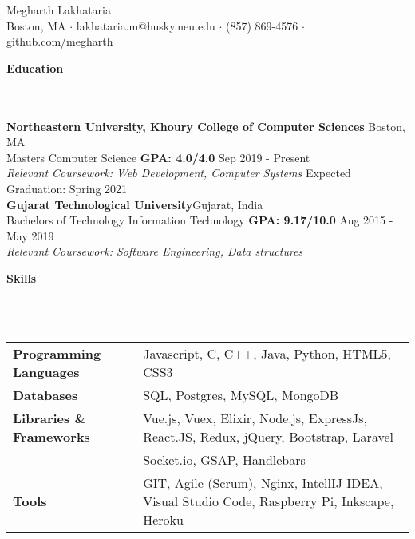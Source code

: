 \documentclass[]{article}
\newcommand{\lineunder} {
    \vspace*{-8pt} \\
    \hrulefill \\
}
\newcommand{\header} [1] {
    {\vspace*{6pt} \fontsize{12}{12}\selectfont \textbf{#1}}
     \lineunder
}
\begin{document}
\vspace*{-40pt}

    

\begin{center}
	{\LARGE {Megharth Lakhataria}}\\
	Boston, MA $\cdot$ lakhataria.m@husky.neu.edu $\cdot$ (857) 869-4576 $\cdot$ github.com/megharth\\
\end{center}

\header{Education}
\hspace{1mm}
\textbf{Northeastern University, Khoury College of Computer Sciences}
\hfill
Boston, MA\\
\hspace{1mm}
Masters Computer Science \textbf{GPA: 4.0/4.0} \hfill Sep 2019 - Present\\
\hspace{1mm}
\textit{Relevant Coursework: Web Development, Computer Systems} \hfill Expected Graduation: Spring 2021\\
\vspace{1mm}
\hspace{1mm}
\textbf{Gujarat Technological University}\hfill Gujarat, India\\
\hspace{1mm}
Bachelors of Technology Information Technology \textbf{GPA: 9.17/10.0}  \hfill Aug 2015 - May 2019 \\
\hspace{1mm}
\textit{Relevant Coursework: Software Engineering, Data structures} \\
\vspace{1mm}


\header{Skills}
\vspace{1mm}
\begin{tabular}{ l l }
	\textbf{Programming Languages} & Javascript, C, C++, Java, Python, HTML5, CSS3            \\
	\textbf{Databases}             & SQL, Postgres, MySQL, MongoDB                            \\
    
    \textbf{Libraries \& Frameworks}             & Vue.js, Vuex, Elixir, Node.js, ExpressJs, React.JS,
    Redux, jQuery, Bootstrap, Laravel  \\
                          & Socket.io, GSAP, Handlebars \\
    
    \textbf{Tools}                & GIT, Agile (Scrum), Nginx, IntellIJ IDEA, Visual Studio Code,
    Raspberry Pi, Inkscape, Heroku \\          
\end{tabular}
\end{document}
